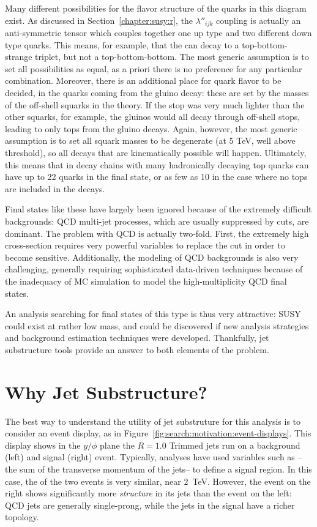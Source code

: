 Many different possibilities for the flavor structure of the quarks in this diagram exist. As discussed in Section~\ref{chapter:susy:r}, the  $\lambda''_{ijk}$ coupling is actually an anti-symmetric tensor which couples together one up type and two different down type quarks. This means, for example, that the \lsp can decay to a top-bottom-strange triplet, but not a top-bottom-bottom. The most generic assumption is to set all possibilities as equal, as a priori there is no preference for any particular combination. Moreover, there is an additional place for quark flavor to be decided, in the quarks coming from the gluino decay: these are set by the masses of the off-shell squarks in the theory. If the stop was very much lighter than the other squarks, for example, the gluinos would all decay through off-shell stops, leading to only tops from the gluino decays. Again, however, the most generic assumption is to set all squark masses to be degenerate (at 5 TeV, well above threshold), so all decays that are kinematically possible will happen. Ultimately, this means that in decay chains with many hadronically decaying top quarks can have up to 22 quarks in the final state, or as few as 10 in the case where no tops are included in the decays. 

Final states like these have largely been ignored because of the extremely difficult backgrounds: QCD multi-jet processes, which are usually suppressed by \met cuts, are dominant. The problem with QCD is actually two-fold. First, the extremely high cross-section requires very powerful variables to replace the \met cut in order to become sensitive. Additionally, the modeling of QCD backgrounds is also very challenging, generally requiring sophisticated data-driven techniques because of the inadequacy of MC simulation to model the high-multiplicity QCD final states.

An analysis searching for final states of this type is thus very attractive: SUSY could exist at rather low mass, and could be discovered if new analysis strategies and background estimation techniques were developed. Thankfully, jet substructure tools provide an answer to both elements of the problem.


\section{Why Jet Substructure?}

The best way to understand the utility of jet substruture for this analysis is to consider an event display, as in Figure~\ref{fig:search:motivation:event-displays}. This display shows in the $y/\phi$ plane the \antikt $R=1.0$ Trimmed jets run on a background (left) and signal (right) event. Typically, analyses have used variables such as \Ht-- the sum of the transverse momentum of the jets-- to define a signal region. In this case, the \Ht of the two events is very similar, near $2$~TeV. However, the event on the right shows significantly more \textit{structure} in its jets than the event on the left: QCD jets are generally single-prong, while the jets in the signal have a richer topology.  


